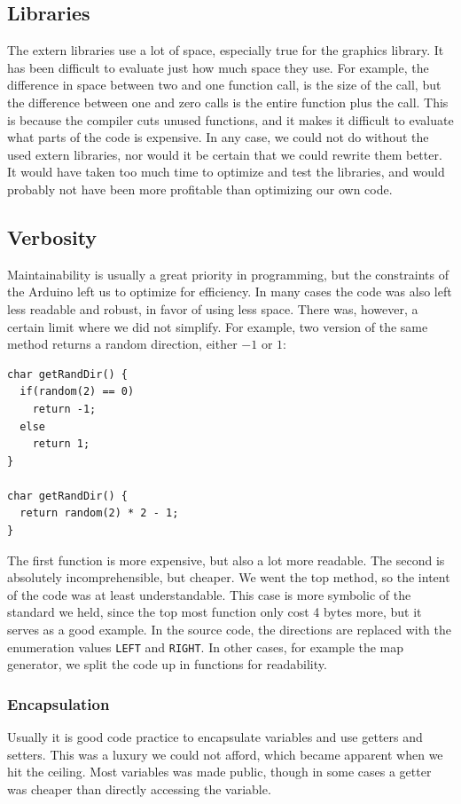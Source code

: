 \subsection*{Libraries} %
The extern libraries use a lot of space, especially true for the graphics library. It has been difficult to evaluate just how much space they use. For example, the difference in space between two and one function call, is the size of the call, but the difference between one and zero calls is the entire function plus the call. This is because the compiler cuts unused functions, and it makes it difficult to evaluate what parts of the code is expensive.
\newline
In any case, we could not do without the used extern libraries, nor would it be certain that we could rewrite them better. It would have taken too much time to optimize and test the libraries, and would probably not have been more profitable than optimizing our own code.

\subsection*{Verbosity} %
Maintainability is usually a great priority in programming, but the constraints of the Arduino left us to optimize for efficiency. In many cases the code was also left less readable and robust, in favor of using less space. There was, however, a certain limit where we did not simplify. For example, two version of the same method returns a random direction, either $-1$ or $1$:
\begin{verbatim}
char getRandDir() {
  if(random(2) == 0)
    return -1;
  else
    return 1;
}

char getRandDir() {
  return random(2) * 2 - 1;
}
\end{verbatim}
The first function is more expensive, but also a lot more readable. The second is absolutely incomprehensible, but cheaper. We went the top method, so the intent of the code was at least understandable. This case is more symbolic of the standard we held, since the top most function only cost 4 bytes more, but it serves as a good example. In the source code, the directions are replaced with the enumeration values {\tt LEFT} and {\tt RIGHT}. In other cases, for example the map generator, we split the code up in functions for readability.

\subsubsection*{Encapsulation} %
Usually it is good code practice to encapsulate variables and use getters and setters. This was a luxury we could not afford, which became apparent when we hit the ceiling. Most variables was made public, though in some cases a getter was cheaper than directly accessing the variable.

